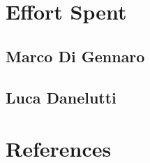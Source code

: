\documentclass[10pt,openany]{book}
\begin{document}
\chapter{Effort Spent}\label{chapt:sum}

	\section{Marco Di Gennaro}

		

	\section{Luca Danelutti}

		

\chapter{References}\label{chapt:sum}

	

\pagebreak




\end{document}
